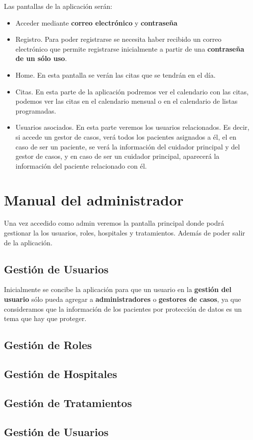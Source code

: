 Las pantallas de la aplicación serán:
\begin{itemize}
	\item Acceder mediante \textbf{correo electrónico} y \textbf{contraseña}
	\item Registro. Para poder registrarse se necesita haber recibido un correo electrónico que permite registrarse inicialmente a partir de una \textbf{contraseña de un sólo uso}.
	\item Home. En esta pantalla se verán las citas que se tendrán en el día.
	\item Citas. En esta parte de la aplicación podremos ver el calendario con las citas, podemos ver las citas en el calendario mensual o en el calendario de listas programadas.
	\item Usuarios asociados. En esta parte veremos los usuarios relacionados. Es decir, si accede un gestor de casos, verá todos los pacientes asignados a él, el en caso de ser un paciente, se verá la información del cuidador principal y del gestor de casos, y en caso de ser un cuidador principal, aparecerá la información del paciente relacionado con él. 
\end{itemize}

\section{Manual del administrador}
Una vez accedido como admin veremos la pantalla principal donde podrá gestionar la los usuarios, roles, hospitales y tratamientos. Además de poder salir de la aplicación.

\subsection{Gestión de Usuarios}
Inicialmente se concibe la aplicación para que un usuario en la \textbf{gestión del usuario} sólo pueda agregar a \textbf{administradores} o \textbf{gestores de casos}, ya que consideramos que la información de los pacientes por protección de datos es un tema que hay que proteger.

\subsection{Gestión de Roles}

\subsection{Gestión de Hospitales}

\subsection{Gestión de Tratamientos}

\subsection{Gestión de Usuarios}


